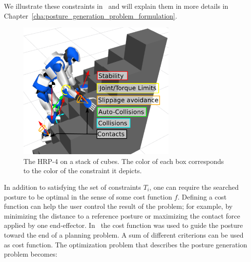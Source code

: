 We illustrate these constraints in~ and will explain them in more details in Chapter~\ref{cha:posture_generation_problem_formulation}.


\begin{figure}[ht]
  \centering
  \includegraphics[width=0.7\textwidth]{PG.pdf}
  \caption{The HRP-4 on a stack of cubes. The color of each box corresponds to the color of the constraint it depicts.}
\label{fig:PG}
\end{figure}

In addition to satisfying the set of constraints $T_i$, one can require the searched posture to be optimal in the sense of some cost function $f$.
Defining a cost function can help the user control the result of the problem; for example, by minimizing the distance to a reference posture or maximizing the contact force applied by one end-effector.
In~\cite{escande2009} the cost function was used to guide the posture toward the end of a planning problem.
A sum of different criterions can be used as cost function.
The optimization problem that describes the posture generation problem becomes:



